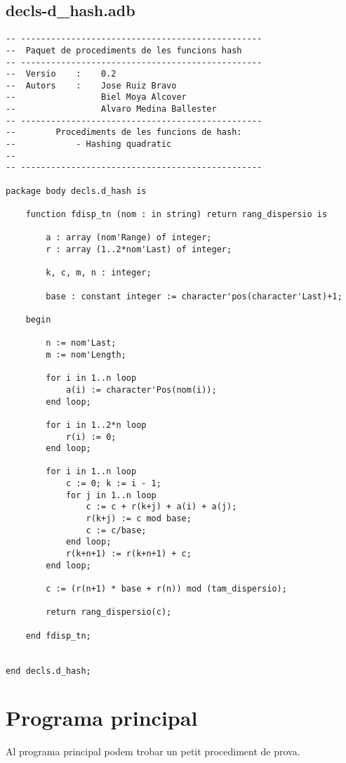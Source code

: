 \documentclass[10pt]{report}
\begin{document}
    \section{decls-d\_hash.adb}
    \begin{lstlisting}[style=Ada]
-- ------------------------------------------------
--  Paquet de procediments de les funcions hash
-- ------------------------------------------------
--  Versio    :    0.2
--  Autors    :    Jose Ruiz Bravo
--                 Biel Moya Alcover
--                 Alvaro Medina Ballester
-- ------------------------------------------------
--        Procediments de les funcions de hash:
--            - Hashing quadratic
--
-- ------------------------------------------------

package body decls.d_hash is

    function fdisp_tn (nom : in string) return rang_dispersio is
        
        a : array (nom'Range) of integer;
        r : array (1..2*nom'Last) of integer;
        
        k, c, m, n : integer;
        
        base : constant integer := character'pos(character'Last)+1;
        
    begin
        
        n := nom'Last;
        m := nom'Length;
    
        for i in 1..n loop
            a(i) := character'Pos(nom(i));
        end loop;
        
        for i in 1..2*n loop
            r(i) := 0;
        end loop;
        
        for i in 1..n loop
            c := 0; k := i - 1;
            for j in 1..n loop
                c := c + r(k+j) + a(i) + a(j);
                r(k+j) := c mod base;
                c := c/base;
            end loop;
            r(k+n+1) := r(k+n+1) + c;
        end loop;
        
        c := (r(n+1) * base + r(n)) mod (tam_dispersio);
        
        return rang_dispersio(c);
        
    end fdisp_tn;
    
    
end decls.d_hash;
    \end{lstlisting}
    \newpage
    
    
    \chapter{Programa principal}
        Al programa principal podem trobar un petit procediment de prova.
    \\
    
\end{document}
